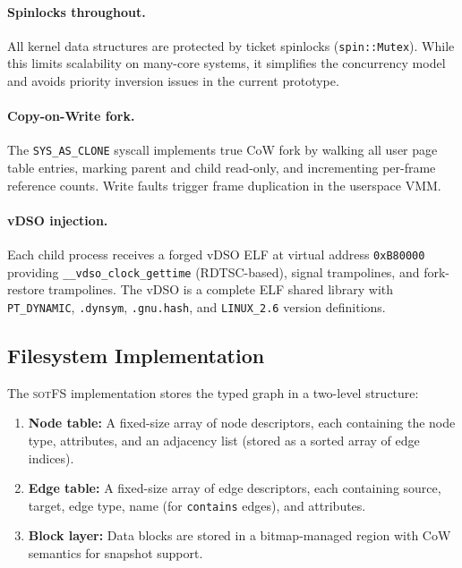 \documentclass[11pt,a4paper]{article}
\theoremstyle{definition}
\theoremstyle{remark}
\newcommand{\sotfs}{\textsc{sotFS}}
\begin{document}
\paragraph{Spinlocks throughout.}
All kernel data structures are protected by ticket spinlocks
(\texttt{spin::Mutex}). While this limits scalability on many-core
systems, it simplifies the concurrency model and avoids priority
inversion issues in the current prototype.

\paragraph{Copy-on-Write fork.}
The \texttt{SYS\_AS\_CLONE} syscall implements true CoW fork by
walking all user page table entries, marking parent and child
read-only, and incrementing per-frame reference counts. Write faults
trigger frame duplication in the userspace VMM.

\paragraph{vDSO injection.}
Each child process receives a forged vDSO ELF at virtual address
\texttt{0xB80000} providing \texttt{\_\_vdso\_clock\_gettime}
(RDTSC-based), signal trampolines, and fork-restore trampolines.
The vDSO is a complete ELF shared library with \texttt{PT\_DYNAMIC},
\texttt{.dynsym}, \texttt{.gnu.hash}, and \texttt{LINUX\_2.6}
version definitions.

\subsection{Filesystem Implementation}
\label{sec:impl-fs}

The \sotfs{} implementation stores the typed graph in a two-level
structure:

\begin{enumerate}
\item \textbf{Node table:} A fixed-size array of node descriptors,
  each containing the node type, attributes, and an adjacency list
  (stored as a sorted array of edge indices).

\item \textbf{Edge table:} A fixed-size array of edge descriptors,
  each containing source, target, edge type, name (for
  \texttt{contains} edges), and attributes.

\item \textbf{Block layer:} Data blocks are stored in a bitmap-managed
  region with CoW semantics for snapshot support.
\end{enumerate}
\end{document}
